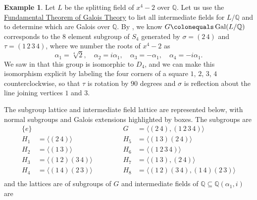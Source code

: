 \documentclass[12pt]{report}
\numberwithin{equation}{section}
\numberwithin{theorem}{chapter}
\theoremstyle{definition}
\newtheorem{example}[theorem]{Example}
\newtheorem*{basic properties}{Basic Properties}
\newtheorem*{Important Remark}{Important Remark}
\DeclareMathOperator{\Gal}{Gal}
\newcommand{\Q}{\mathbb{Q}}
\begin{document}
\begin{example}
Let $L$ be the splitting field of $x^4 - 2$ over $\Q$. Let us use the \hyperref[Fundamental Theorem of Galois Theory]{Fundamental Theorem of Galois Theory} to list all intermediate fields for $L/\Q$ and to determine which are Galois over $\Q$.
By , we know $G \colonequals \Gal(L/\Q)$ corresponds to the $8$ element subgroup of $S_4$ generated by $\sigma = (2 \, 4)$ and $\tau = (1 \, 2 \,  3 \, 4)$, where we number the roots of $x^4-2$ as 
$$\alpha_1 = \sqrt[4]{2}, \quad \alpha_2 = i \alpha_1, \quad \alpha_3 = -\alpha_1, \quad \alpha_4 = -i \alpha_1.$$
We saw in  that this group is isomorphic to $D_4$, and we can make this isomorphism explicit by labeling the four corners of a square $1$, $2$, $3$, $4$ counterclockwise, so that $\tau$ is rotation by $90$ degrees and $\sigma$ is reflection about the line joining vertices $1$ and $3$.

The subgroup lattice and intermediate field lattice are represented below, with normal subgroups and Galois extensions highlighted by boxes.
The subgroups are
$$\begin{aligned}
\{e\} && \qquad &&  G &= \langle (2 \, 4), (1 \, 2 \, 3 \,4) \rangle \\
H_1 &= \langle (2 \, 4) \rangle & \qquad && H_5 &= \langle (1 \,3)(2 \, 4)  \rangle \\
H_2 &= \langle (1 \, 3)  \rangle & \qquad && H_6 & = \langle (1 \, 2 \, 3 \,4) \rangle \\
H_3 &= \langle (1 \, 2)(3 \, 4)  \rangle & \qquad && H_7 &= \langle  (1 \, 3), (2 \, 4)  \rangle \\
H_4 & = \langle (1 \,4)(2 \, 3)  \rangle & \qquad && H_8 &= \langle (1 \, 2)(3 \, 4), (1 \,4)(2 \, 3)  \rangle \\
\end{aligned}$$
and the lattices are of subgroups of $G$ and intermediate fields of $\Q \subseteq \Q(\alpha_1, i)$ are

\vspace{0.5em}


\end{example}
\end{document}
